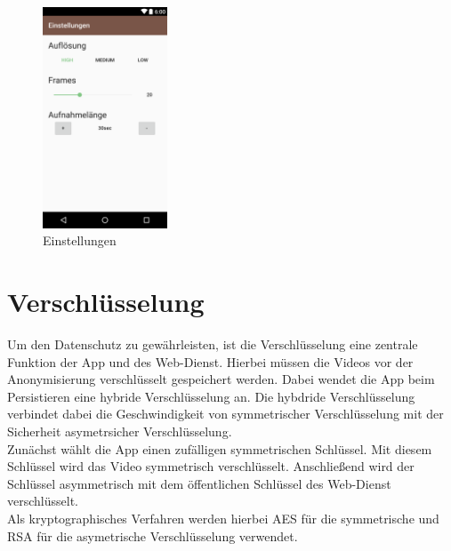 \begin{figure}
	\centering
	\includegraphics[width=0.33\textwidth]{subtopicsFuncspec/Res/Mockups/Settings1.png}
 	 \caption{Einstellungen}
\end{figure}

\newpage

\section{Verschlüsselung} \label{sec:Verschlüsselung}

Um den Datenschutz zu gewährleisten, ist die Verschl\"usselung eine zentrale Funktion der App und des Web-Dienst. Hierbei m\"ussen die Videos vor der Anonymisierung verschlüsselt gespeichert werden. Dabei wendet die App beim Persistieren eine hybride Verschlüsselung an. Die hybdride Verschlüsselung verbindet dabei die Geschwindigkeit von symmetrischer Verschlüsselung mit der Sicherheit asymetrsicher Verschlüsselung.\\
Zunächst wählt die App einen zufälligen symmetrischen Schlüssel. Mit diesem Schlüssel wird das Video symmetrisch verschlüsselt. Anschließend wird der Schlüssel asymmetrisch mit dem öffentlichen Schlüssel des Web-Dienst verschlüsselt. \\
Als kryptographisches Verfahren werden hierbei AES für die symmetrische und RSA für die asymetrische Verschlüsselung verwendet.


